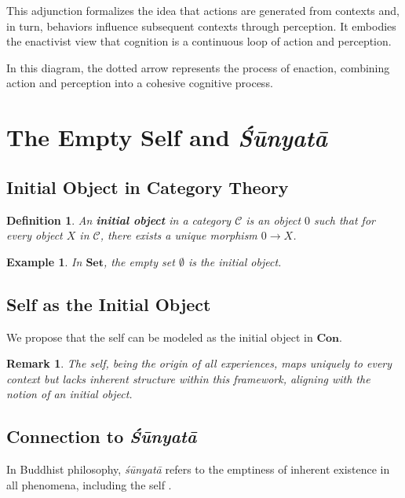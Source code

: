 \documentclass{article}
\newtheorem{definition}{Definition}[section]
\newtheorem{remark}{Remark}[section]
\newtheorem{example}{Example}[section]
\begin{document}
This adjunction formalizes the idea that actions are generated from contexts and, in turn, behaviors influence subsequent contexts through perception. It embodies the enactivist view that cognition is a continuous loop of action and perception.

In this diagram, the dotted arrow represents the process of enaction, combining action and perception into a cohesive cognitive process.

\section{The Empty Self and \emph{Śūnyatā}}

\subsection{Initial Object in Category Theory}

\begin{definition} An \textbf{initial object} in a category $\mathcal{C}$ is an object $0$ such that for every object $X$ in $\mathcal{C}$, there exists a unique morphism $0 \to X$. \end{definition}

\begin{example} In $\mathbf{Set}$, the empty set $\emptyset$ is the initial object. \end{example}

\subsection{Self as the Initial Object}

We propose that the self can be modeled as the initial object in $\mathbf{Con}$.

\begin{remark} The self, being the origin of all experiences, maps uniquely to every context but lacks inherent structure within this framework, aligning with the notion of an initial object. \end{remark}

\subsection{Connection to \emph{Śūnyatā}}

In Buddhist philosophy, \emph{śūnyatā} refers to the emptiness of inherent existence in all phenomena, including the self \cite{garfield1995}.
\end{document}
